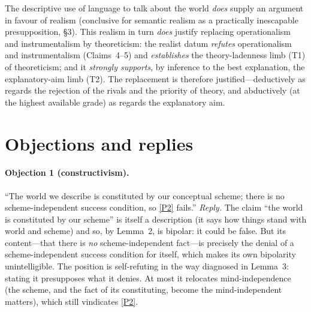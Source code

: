 \documentclass[12pt]{article}
\begin{document}
\begin{description}[leftmargin=1.6em,style=nextline]
\item[Final verdict.] The descriptive use of language to talk about the
world \emph{does} supply an argument in favour of realism (conclusive for
semantic realism as a practically inescapable presupposition,
\S3). This realism in turn \emph{does} justify replacing operationalism
and instrumentalism by theoreticism: the realist datum \emph{refutes}
operationalism and instrumentalism (Claims~4--5) and \emph{establishes}
the theory-ladenness limb (T1) of theoreticism; and it \emph{strongly
supports}, by inference to the best explanation, the explanatory-aim limb
(T2). The replacement is therefore justified---deductively as regards the
rejection of the rivals and the priority of theory, and abductively (at
the highest available grade) as regards the explanatory aim.
\end{description}

\section{Objections and replies}

\paragraph{Objection 1 (constructivism).} ``The world we describe is
constituted by our conceptual scheme; there is no scheme-independent
success condition, so \ref{P2} fails.'' \emph{Reply.} The claim ``the
world is constituted by our scheme'' is itself a description (it says how
things stand with world and scheme) and so, by Lemma~2, is bipolar: it
could be false. But its content---that there is \emph{no}
scheme-independent fact---is precisely the denial of a scheme-independent
success condition for itself, which makes its own bipolarity
unintelligible. The position is self-refuting in the way diagnosed in
Lemma~3: stating it presupposes what it denies. At most it relocates
mind-independence (the scheme, and the fact of its constituting, become
the mind-independent matters), which still vindicates \ref{P2}.
\end{document}
